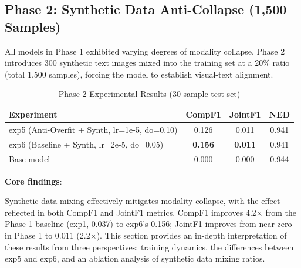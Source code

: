 \subsection{Phase 2: Synthetic Data Anti-Collapse (1,500 Samples)}

All models in Phase 1 exhibited varying degrees of modality collapse. Phase 2 introduces 300 synthetic text images mixed into the training set at a 20\% ratio (total 1,500 samples), forcing the model to establish visual-text alignment.

\begin{table}[h]
\centering
\caption{Phase 2 Experimental Results (30-sample test set)}
\begin{tabular}{lccc}
\toprule
\textbf{Experiment} & \textbf{CompF1} & \textbf{JointF1} & \textbf{NED} \\
\midrule
exp5 (Anti-Overfit + Synth, lr=1e-5, do=0.10) & 0.126 & 0.011 & 0.941 \\
exp6 (Baseline + Synth, lr=2e-5, do=0.05)     & \textbf{0.156} & \textbf{0.011} & 0.941 \\
\midrule
Base model & 0.000 & 0.000 & 0.944 \\
\bottomrule
\end{tabular}
\end{table}

\textbf{Core findings}:

Synthetic data mixing effectively mitigates modality collapse, with the effect reflected in both CompF1 and JointF1 metrics. CompF1 improves 4.2$\times$ from the Phase 1 baseline (exp1, 0.037) to exp6's 0.156; JointF1 improves from near zero in Phase 1 to 0.011 (2.2$\times$). This section provides an in-depth interpretation of these results from three perspectives: training dynamics, the differences between exp5 and exp6, and an ablation analysis of synthetic data mixing ratios.

